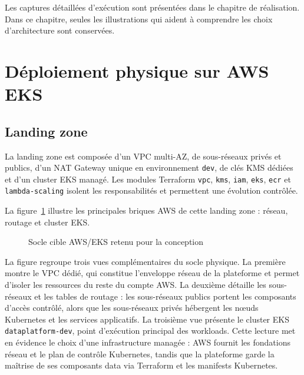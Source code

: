 Les captures détaillées d'exécution sont présentées dans le chapitre de réalisation. Dans ce chapitre, seules les illustrations qui aident à comprendre les choix d'architecture sont conservées.

\section{Déploiement physique sur AWS EKS}

\subsection{Landing zone}

La landing zone est composée d'un VPC multi-AZ, de sous-réseaux privés et publics, d'un NAT Gateway unique en environnement \texttt{dev}, de clés KMS dédiées et d'un cluster EKS managé. Les modules Terraform \texttt{vpc}, \texttt{kms}, \texttt{iam}, \texttt{eks}, \texttt{ecr} et \texttt{lambda-scaling} isolent les responsabilités et permettent une évolution contrôlée.

La figure~\ref{fig:conception-socle-aws-eks} illustre les principales briques AWS de cette landing zone : réseau, routage et cluster EKS.

\begin{figure}[H]
\centering
{}
\caption{Socle cible AWS/EKS retenu pour la conception}
\label{fig:conception-socle-aws-eks}
\end{figure}

La figure regroupe trois vues complémentaires du socle physique. La première montre le VPC dédié, qui constitue l'enveloppe réseau de la plateforme et permet d'isoler les ressources du reste du compte AWS. La deuxième détaille les sous-réseaux et les tables de routage : les sous-réseaux publics portent les composants d'accès contrôlé, alors que les sous-réseaux privés hébergent les nœuds Kubernetes et les services applicatifs. La troisième vue présente le cluster EKS \texttt{dataplatform-dev}, point d'exécution principal des workloads. Cette lecture met en évidence le choix d'une infrastructure managée : AWS fournit les fondations réseau et le plan de contrôle Kubernetes, tandis que la plateforme garde la maîtrise de ses composants data via Terraform et les manifests Kubernetes.

